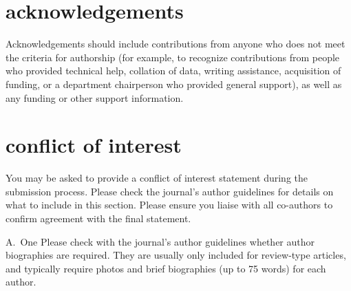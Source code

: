 \documentclass[alpha-refs]{wiley-article}
\begin{document}
\section*{acknowledgements}
Acknowledgements should include contributions from anyone who does not meet the criteria for authorship (for example, to recognize contributions from people who provided technical help, collation of data, writing assistance, acquisition of funding, or a department chairperson who provided general support), as well as any funding or other support information.

\section*{conflict of interest}
You may be asked to provide a conflict of interest statement during the submission process. Please check the journal's author guidelines for details on what to include in this section. Please ensure you liaise with all co-authors to confirm agreement with the final statement.

\printendnotes



\begin{biography}{A.~One}
Please check with the journal's author guidelines whether author biographies are required. They are usually only included for review-type articles, and typically require photos and brief biographies (up to 75 words) for each author.
\bigskip
\bigskip
\end{biography}

\end{document}
